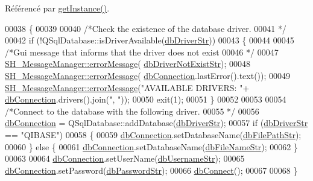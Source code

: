 Référencé par \hyperlink{classSH__DatabaseManager_a31198eb4de0f8b18e3fa0eed09f24d19}{get\-Instance()}.


\begin{DoxyCode}
00038 \{
00039 
00040     \textcolor{comment}{/*Check the existence of the database driver.
}
00041 \textcolor{comment}{    */}
00042     \textcolor{keywordflow}{if} (!QSqlDatabase::isDriverAvailable(\hyperlink{SH__DatabaseManager_8h_a867ada6d1926e2ded0e68678e02a19c7}{dbDriverStr}))
00043     \{
00044 
00045         \textcolor{comment}{/*Gui message that informs that the driver does not exist
}
00046 \textcolor{comment}{    */}
00047         \hyperlink{classSH__MessageManager_a0cb4f06cf67539457482ba1c8544eb06}{SH\_MessageManager::errorMessage}(
      \hyperlink{SH__DatabaseManager_8h_adeeb3449586b533bdd3cd5938d501807}{dbDriverNotExistStr});
00048         \hyperlink{classSH__MessageManager_a0cb4f06cf67539457482ba1c8544eb06}{SH\_MessageManager::errorMessage}(
      \hyperlink{classSH__DatabaseManager_a9291f61c3abbba2c4f1567b1d8325f0e}{dbConnection}.lastError().text());
00049         \hyperlink{classSH__MessageManager_a0cb4f06cf67539457482ba1c8544eb06}{SH\_MessageManager::errorMessage}(\textcolor{stringliteral}{"AVAILABLE DRIVERS: "}+
      \hyperlink{classSH__DatabaseManager_a9291f61c3abbba2c4f1567b1d8325f0e}{dbConnection}.drivers().join(\textcolor{stringliteral}{", "}));
00050         exit(1);
00051     \}
00052 
00053 
00054     \textcolor{comment}{/*Connect to the database with the following driver.
}
00055 \textcolor{comment}{    */}
00056     \hyperlink{classSH__DatabaseManager_a9291f61c3abbba2c4f1567b1d8325f0e}{dbConnection} = QSqlDatabase::addDatabase(\hyperlink{SH__DatabaseManager_8h_a867ada6d1926e2ded0e68678e02a19c7}{dbDriverStr});
00057     \textcolor{keywordflow}{if} (\hyperlink{SH__DatabaseManager_8h_a867ada6d1926e2ded0e68678e02a19c7}{dbDriverStr} == \textcolor{stringliteral}{"QIBASE"})
00058     \{
00059         \hyperlink{classSH__DatabaseManager_a9291f61c3abbba2c4f1567b1d8325f0e}{dbConnection}.setDatabaseName(\hyperlink{SH__DatabaseManager_8h_acee79beb6e5aec996fd46b84264d072a}{dbFilePathStr});
00060     \} \textcolor{keywordflow}{else} \{
00061         \hyperlink{classSH__DatabaseManager_a9291f61c3abbba2c4f1567b1d8325f0e}{dbConnection}.setDatabaseName(\hyperlink{SH__DatabaseManager_8h_a6c6a636455d1d86d7215a52de4bc6828}{dbFileNameStr});
00062     \}
00063 
00064     \hyperlink{classSH__DatabaseManager_a9291f61c3abbba2c4f1567b1d8325f0e}{dbConnection}.setUserName(\hyperlink{SH__DatabaseManager_8h_a15964752bd7d7c2075f3bafca2218411}{dbUsernameStr});
00065     \hyperlink{classSH__DatabaseManager_a9291f61c3abbba2c4f1567b1d8325f0e}{dbConnection}.setPassword(\hyperlink{SH__DatabaseManager_8h_a5dbd4602b69f5a87243d49f9c873ac64}{dbPasswordStr});
00066     \hyperlink{classSH__DatabaseManager_ab634ce39ef483e7ad2fe08d4b8ba74f7}{dbConnect}();
00067 
00068 \}
\end{DoxyCode}
